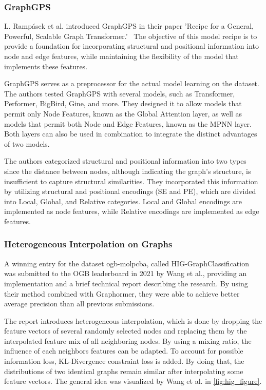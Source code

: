 \subsubsection{GraphGPS}
L. Rampásek et al. introduced GraphGPS in their paper 'Recipe for a General, Powerful, Scalable Graph Transformer.'~\cite{2023graphgps} The objective of this model recipe is to provide a foundation for incorporating structural and positional information into node and edge features, while maintaining the flexibility of the model that implements these features.

GraphGPS serves as a preprocessor for the actual model learning on the dataset. The authors tested GraphGPS with several models, such as Transformer, Performer, BigBird, Gine, and more. They designed it to allow models that permit only Node Features, known as the Global Attention layer, as well as models that permit both Node and Edge Features, known as the MPNN layer. Both layers can also be used in combination to integrate the distinct advantages of two models.

The authors categorized structural and positional information into two types since the distance between nodes, although indicating the graph's structure, is insufficient to capture structural similarities. They incorporated this information by utilizing structural and positional encodings (SE and PE), which are divided into Local, Global, and Relative categories. Local and Global encodings are implemented as node features, while Relative encodings are implemented as edge features.

\subsubsection{Heterogeneous Interpolation on Graphs}
A winning entry for the dataset ogb-molpcba, called HIG-GraphClassification~\cite{tencenc2021Hig,tencenc2021HigPaper} was submitted to the OGB leaderboard in 2021 by Wang et al., providing an implementation and a brief technical report describing the research. By using their method combined with Graphormer, they were able to achieve better average precision than all previous submissions.

The report introduces heterogeneous interpolation, which is done by dropping the feature vectors of several randomly selected nodes and replacing them by the interpolated feature mix of all neighboring nodes.
By using a mixing ratio, the influence of each neighbors features can be adapted. To account for possible information loss, KL-Divergence constraint loss is added. By doing that, the distributions of two identical graphs remain similar after interpolating some feature vectors. The general idea was visualized by Wang et al. in \autoref{fig:hig_figure}.

